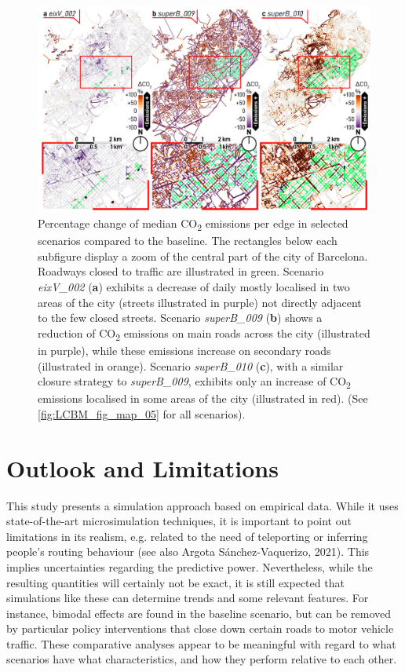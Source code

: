 \begin{figure}[htbp!]
    \centering
    \includegraphics[width=1\textwidth]{LCBM_fig12.jpg}
    \caption{Percentage change of median CO\textsubscript{2} emissions per edge in selected scenarios compared to the baseline. The rectangles below each subfigure display a zoom of the central part of the city of Barcelona. Roadways closed to traffic are illustrated in green. Scenario \emph{eixV\_002} (\textbf{a}) exhibits a decrease of daily mostly localised in two areas of the city (streets illustrated in purple) not directly adjacent to the few closed streets. Scenario \emph{superB\_009} (\textbf{b}) shows a reduction of CO\textsubscript{2} emissions on main roads across the city (illustrated in purple), while these emissions increase on secondary roads (illustrated in orange). Scenario \emph{superB\_010} (\textbf{c}), with a similar closure strategy to \emph{superB\_009}, exhibits only an increase of CO\textsubscript{2} emissions localised in some areas of the city (illustrated in red). (See \cref{fig:LCBM_fig_map_05} for all scenarios).}
   \label{fig:LCBM_fig12}
\end{figure}

\section{Outlook and Limitations}
\label{sec:LCBM_5_outlook_limitations}

This study presents a simulation approach based on empirical data. While it uses state-of-the-art microsimulation techniques, it is important to point out limitations in its realism, e.g. related to the need of teleporting or inferring people’s routing behaviour (see also Argota Sánchez-Vaquerizo, 2021). This implies uncertainties regarding the predictive power. Nevertheless, while the resulting quantities will certainly not be exact, it is still expected that simulations like these can determine trends and some relevant features. For instance, bimodal effects are found in the baseline scenario, but can be removed by particular policy interventions that close down certain roads to motor vehicle traffic. These comparative analyses appear to be meaningful with regard to what scenarios have what characteristics, and how they perform relative to each other. 

